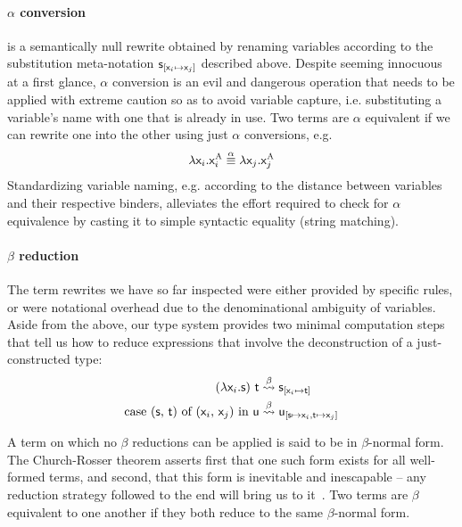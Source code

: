 \paragraph{$\alpha$ conversion} is a semantically null rewrite obtained by renaming variables according to the substitution meta-notation $\mathsf{s}_{[\mathsf{\mathsf{x}_{\mathnormal{i}} } \mapsto \mathsf{\mathsf{x}_{\mathnormal{j}}}]}$ described above. 
Despite seeming innocuous at a first glance, $\alpha$ conversion is an evil and dangerous operation that needs to be applied with extreme caution so as to avoid variable capture, i.e. substituting a variable's name with one that is already in use.  
Two terms are $\alpha$ equivalent if we can rewrite one into the other using just $\alpha$ conversions, e.g.
\begin{equation}
	\mathnormal{\lambda} \mathsf{x}_{\mathnormal{i}} .\mathsf{x}_{\mathnormal{i}} ^{\normalfont\textsc{A}} \overset{\alpha}{\equiv} \mathnormal{\lambda} \mathsf{x}_{\mathnormal{j}}.\mathsf{x}_{\mathnormal{j}}^{\normalfont\textsc{A}}
\end{equation}
Standardizing variable naming, e.g. according to the distance between variables and their respective binders, alleviates the effort required to check for $\alpha$ equivalence by casting it to simple syntactic equality (string matching).

\paragraph{$\beta$ reduction}
The term rewrites we have so far inspected were either provided by specific rules, or were notational overhead due to the denominational ambiguity of variables.
Aside from the above, our type system provides two minimal computation steps that tell us how to reduce expressions that involve the deconstruction of a just-constructed type:
\begin{align}
(\mathsf{\mathnormal{\lambda} \mathsf{x}_{\mathnormal{i}} .s})~\mathsf{t} & \overset{\beta}{\leadsto} \mathsf{s}_{[\mathsf{\mathsf{x}_{\mathnormal{i}} } \mapsto \mathsf{t}]}\\
\textrm{case (\ensuremath{\mathsf{s}}, \ensuremath{\mathsf{t}}) of (\ensuremath{\mathsf{\mathsf{x}_{\mathnormal{i}} }}, \ensuremath{\mathsf{\mathsf{x}_{\mathnormal{j}}}}) in \ensuremath{\mathsf{u}}} & \overset{\beta}{\leadsto} \mathsf{u_{[\mathsf{s} \mapsto \mathsf{\mathsf{x}_{\mathnormal{i}} }, \mathsf{t} \mapsto \mathsf{\mathsf{x}_{\mathnormal{j}}}]}}
\end{align}

A term on which no $\beta$ reductions can be applied is said to be in $\beta$-normal form.
The Church-Rosser theorem asserts first that one such form exists for all well-formed terms, and second, that this form is inevitable and inescapable -- any reduction strategy followed to the end will bring us to it~\cite{barendregt1984lambda}.
Two terms are $\beta$ equivalent to one another if they both reduce to the same $\beta$-normal form.

